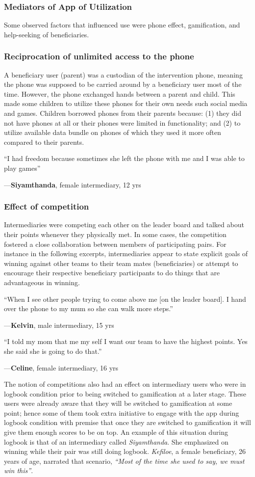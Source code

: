 \documentclass{sig-alternate}
\newenvironment{myquote}
               {\list{}{\rightmargin   \leftmargin
                        \parsep        0in }%
                \item\relax}
               {\endlist}
\newcommand{\userquote}[2]{\begin{samepage}\begin{myquote} 
     \em{\small{#2\begin{flushright}---#1\end{flushright}}}
   \end{myquote}\end{samepage}}
\begin{document}
\subsubsection{Mediators of App of Utilization}
Some observed factors that influenced use were phone effect, gamification, and help-seeking of beneficiaries.
\subsubsection*{\textbf{Reciprocation of unlimited access to the phone}}
A beneficiary user (parent) was a custodian of the intervention phone, meaning the phone was supposed to be carried around by a beneficiary user most of the time. However, the phone exchanged hands between a parent and child. This made some children to utilize these phones for their own needs such social media and games. Children borrowed phones from their parents because: (1) they did not have phones at all or their phones were limited in functionality; and (2) to utilize available data bundle on phones of which they used it more often compared to their parents.

\userquote{\textbf{Siyamthanda}, female intermediary, 12 yrs} {``I had freedom because sometimes she left the phone with me and I was able to play games''}

\subsubsection*{\textbf{Effect of competition}}
Intermediaries were competing each other on the leader board and talked about their points whenever they physically met. In some cases, the competition fostered a close collaboration between members of participating pairs. For instance in the following excerpts, intermediaries appear to state explicit goals of winning against other teams to their team mates (beneficiaries) or attempt to encourage their respective beneficiary participants to do things that are advantageous in winning.

\userquote{\textbf{Kelvin}, male intermediary, 15 yrs} {``When I see other people trying to come above me [on the leader board]. I hand over the phone to my mum so she can walk more steps.''} 

\userquote{\textbf{Celine}, female intermediary, 16 yrs} {``I told my mom that me my self I want our team to have the highest points. Yes she said she is going to do that.''} 

The notion of competitions also had an effect on intermediary users who were in logbook condition prior to being switched to gamification at a later stage. These users were already aware that they will be switched to gamification at some point; hence some of them took extra initiative to engage with the app during logbook condition with premise that once they are switched to gamification it will give them enough scores to be on top. An example of this situation during logbook is that of an intermediary called  \emph{Siyamthanda}. She emphasized on winning while their pair was still doing logbook. \emph{Kefiloe}, a female beneficiary, 26 years of age, narrated that scenario, \emph{``Most of the time she used to say, we must win this''}. 
\end{document}

